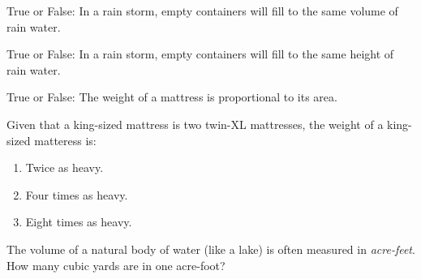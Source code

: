 \documentclass[noauthor,nooutcomes]{ximera}
\author{Bart Snapp}
\begin{document}
\maketitle


\begin{exercise}
  True or False: In a rain storm, empty containers will fill to the same volume of rain water.
\end{exercise}




\begin{exercise}
  True or False: In a rain storm, empty containers will fill to the same height of rain water.
\end{exercise}


\begin{exercise}
  True or False: The weight of a mattress is proportional to its area.
\end{exercise}



\begin{exercise}
  Given that a king-sized mattress is two twin-XL mattresses, the weight of a king-sized matteress is:
  \begin{enumerate}
  \item Twice as heavy.
  \item Four times as heavy.
  \item Eight times as heavy.
  \end{enumerate}
\end{exercise}


\begin{exercise}
  The volume of a natural body of water (like a lake)  is often measured in
  \textit{acre-feet}. How many cubic yards are in one acre-foot?
\end{exercise}







\end{document}
